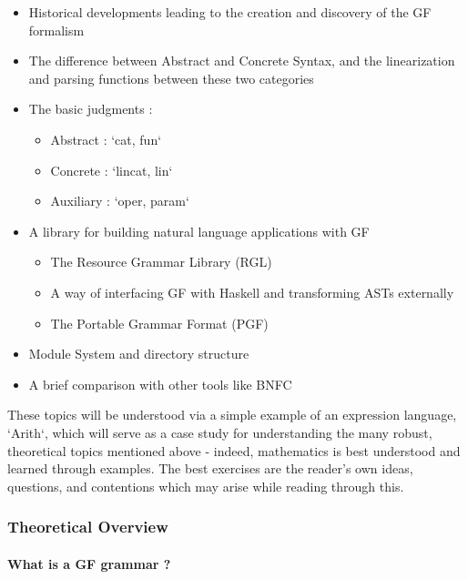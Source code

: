 \begin{itemize}[noitemsep]

\item Historical developments leading to the creation and discovery of the GF
formalism
\item The difference between Abstract and Concrete Syntax, and the linearization
and parsing functions between these two categories
\item The basic judgments :
  \begin{itemize}[noitemsep]
    \item Abstract : `cat, fun`
    \item Concrete : `lincat, lin`
    \item Auxiliary : `oper, param`
  \end{itemize}
\item A library for building natural language applications with GF
  \begin{itemize}[noitemsep]
    \item The Resource Grammar Library (RGL)
    \item A way of interfacing GF with Haskell and transforming ASTs externally
    \item The Portable Grammar Format (PGF)
\end{itemize}
\item Module System and directory structure
\item A brief comparison with other tools like BNFC

\end{itemize}

These topics will be understood via a simple example of an expression language,
`Arith`, which will serve as a case study for understanding the many robust,
theoretical topics mentioned above - indeed, mathematics is best understood and
learned through examples. The best exercises are the reader's own ideas,
questions, and contentions which may arise while reading through this.

\subsubsection{Theoretical Overview}

\paragraph { What is a GF grammar ? }

